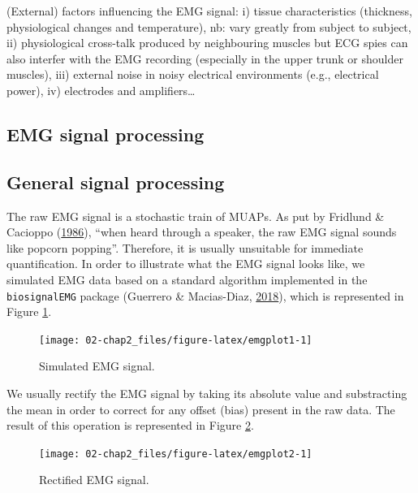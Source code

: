 \documentclass[a4paper,12pt,twoside,openright,oldfontcommands]{memoir}
\begin{document}
(External) factors influencing the EMG signal: i) tissue characteristics
(thickness, physiological changes and temperature), nb: vary greatly
from subject to subject, ii) physiological cross-talk produced by
neighbouring muscles but ECG spies can also interfer with the EMG
recording (especially in the upper trunk or shoulder muscles), iii)
external noise in noisy electrical environments (e.g., electrical
power), iv) electrodes and amplifiers\ldots{}

\subsection{EMG signal processing}\label{emg-signal-processing}

\subsection{General signal processing}\label{general-signal-processing}

The raw EMG signal is a stochastic train of MUAPs. As put by Fridlund \&
Cacioppo (\protect\hyperlink{ref-fridlund_guidelines_1986}{1986}),
``when heard through a speaker, the raw EMG signal sounds like popcorn
popping''. Therefore, it is usually unsuitable for immediate
quantification. In order to illustrate what the EMG signal looks like,
we simulated EMG data based on a standard algorithm implemented in the
\texttt{biosignalEMG} package (Guerrero \& Macias-Diaz,
\protect\hyperlink{ref-R-biosignalEMG}{2018}), which is represented in
Figure \ref{fig:emgplot1}.

\begin{figure}[H]

{\centering \texttt{[image: 02-chap2\_files/figure-latex/emgplot1-1]} 

}

\caption{Simulated EMG signal.}\label{fig:emgplot1}
\end{figure}

We usually rectify the EMG signal by taking its absolute value and
substracting the mean in order to correct for any offset (bias) present
in the raw data. The result of this operation is represented in Figure
\ref{fig:emgplot2}.

\begin{figure}[H]

{\centering \texttt{[image: 02-chap2\_files/figure-latex/emgplot2-1]} 

}

\caption{Rectified EMG signal.}\label{fig:emgplot2}
\end{figure}
\end{document}
